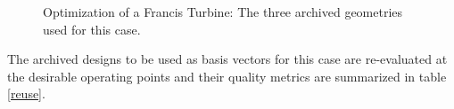 \begin{figure}[h!]
\begin{minipage}[b]{1\linewidth}
 \centering
\end{minipage}
\caption{Optimization of a Francis Turbine: The three archived geometries used for this case.}
\label{design-bases}
\end{figure}

The archived designs to be used as basis vectors for this case are re-evaluated at the desirable operating points and their quality metrics are summarized in table \ref{reuse}.

